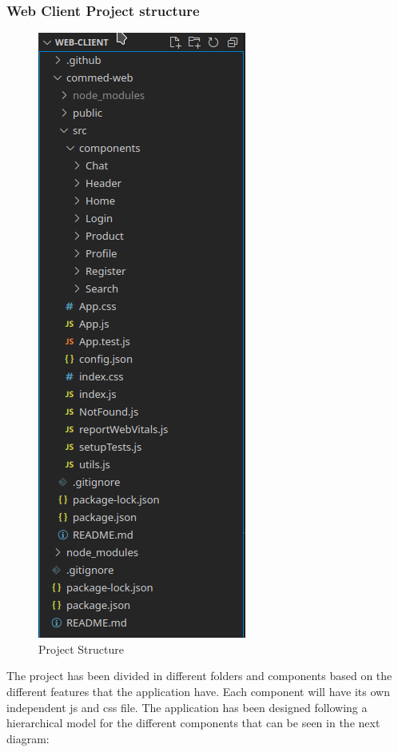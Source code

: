 \documentclass[./main.tex]{subfiles}
\begin{document}
\subsubsection{Web Client Project structure}
\begin{figure}[H]
	\centering
	\includegraphics{img/web-client-project.png}
	\caption{Project Structure}
	\label{fig:redux}
\end{figure}
The project has been divided in different folders and components based on the different features that the application have. Each component will have its own independent js and css file. The application has been designed following a hierarchical model for the different components that can be seen in the next diagram:
\end{document}
